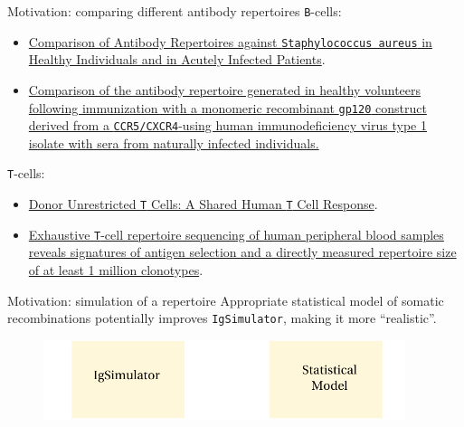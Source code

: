 \documentclass{beamer}\usepackage[]{graphicx}\usepackage[]{color}
\begin{document}
\begin{frame}{Motivation: comparing different antibody repertoires}
  \texttt{B}-cells:
  {\small
  \begin{itemize}
    \item \href{http://www.ncbi.nlm.nih.gov/pmc/articles/PMC1065207/}{Comparison of Antibody Repertoires against \texttt{Staphylococcus aureus} in 
  Healthy Individuals and in Acutely Infected Patients}.
  
\item \href{http://www.ncbi.nlm.nih.gov/pubmed/9882391}{Comparison of the antibody repertoire generated in healthy volunteers following immunization with a monomeric recombinant \texttt{gp120} 
  construct derived from a \texttt{CCR5/CXCR4}-using human immunodeficiency virus type 1 isolate with sera from naturally infected individuals.} 
  \end{itemize}

  \bigskip
  \texttt{T}-cells:
  \begin{itemize}
    \item \href{http://www.ncbi.nlm.nih.gov/pubmed/26297792}{Donor Unrestricted \texttt{T} Cells: A Shared Human \texttt{T} Cell Response}.
    \item \href{http://www.ncbi.nlm.nih.gov/pubmed/21349924}{Exhaustive \texttt{T}-cell repertoire sequencing of human peripheral blood samples reveals signatures of antigen selection and a directly measured repertoire size of at least 1 million clonotypes}.
  \end{itemize}
}
\end{frame}

\begin{frame}{Motivation: simulation of a repertoire}
  Appropriate statistical model of somatic recombinations potentially improves \texttt{IgSimulator}, making it more ``realistic''.
  
  \begin{figure}[h]
    \center\includegraphics[width=300pt]{Pictures/igsimulator.pdf}
  \end{figure}
\end{frame}
\end{document}
